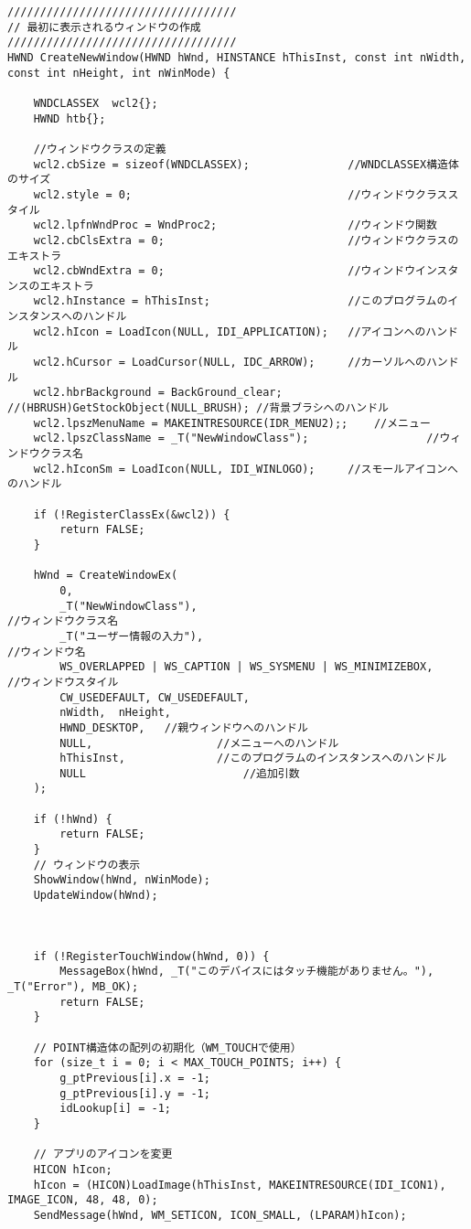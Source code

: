 \begin{lstlisting}[caption=UserInfoWindow.cpp]
///////////////////////////////////
// 最初に表示されるウィンドウの作成
///////////////////////////////////
HWND CreateNewWindow(HWND hWnd, HINSTANCE hThisInst, const int nWidth, const int nHeight, int nWinMode) {

	WNDCLASSEX	wcl2{};
	HWND htb{};

	//ウィンドウクラスの定義
	wcl2.cbSize = sizeof(WNDCLASSEX);				//WNDCLASSEX構造体のサイズ
	wcl2.style = 0;									//ウィンドウクラススタイル
	wcl2.lpfnWndProc = WndProc2;					//ウィンドウ関数
	wcl2.cbClsExtra = 0;							//ウィンドウクラスのエキストラ
	wcl2.cbWndExtra = 0;							//ウィンドウインスタンスのエキストラ
	wcl2.hInstance = hThisInst;						//このプログラムのインスタンスへのハンドル
	wcl2.hIcon = LoadIcon(NULL, IDI_APPLICATION);	//アイコンへのハンドル
	wcl2.hCursor = LoadCursor(NULL, IDC_ARROW);		//カーソルへのハンドル
	wcl2.hbrBackground = BackGround_clear;           //(HBRUSH)GetStockObject(NULL_BRUSH); //背景ブラシへのハンドル
	wcl2.lpszMenuName = MAKEINTRESOURCE(IDR_MENU2);;	//メニュー
	wcl2.lpszClassName = _T("NewWindowClass");					//ウィンドウクラス名
	wcl2.hIconSm = LoadIcon(NULL, IDI_WINLOGO);		//スモールアイコンへのハンドル

	if (!RegisterClassEx(&wcl2)) {
		return FALSE;
	}

	hWnd = CreateWindowEx(
		0,                                                                                            
		_T("NewWindowClass"),                                                                          //ウィンドウクラス名
		_T("ユーザー情報の入力"),				                                                         //ウィンドウ名
		WS_OVERLAPPED | WS_CAPTION | WS_SYSMENU | WS_MINIMIZEBOX,	 //ウィンドウスタイル
		CW_USEDEFAULT, CW_USEDEFAULT,			 
		nWidth,	 nHeight,			    
		HWND_DESKTOP,	//親ウィンドウへのハンドル
		NULL,					//メニューへのハンドル
		hThisInst,				//このプログラムのインスタンスへのハンドル
		NULL					    //追加引数
	);

	if (!hWnd) {
		return FALSE;
	}
	// ウィンドウの表示
	ShowWindow(hWnd, nWinMode);
	UpdateWindow(hWnd);



	if (!RegisterTouchWindow(hWnd, 0)) {
		MessageBox(hWnd, _T("このデバイスにはタッチ機能がありません。"), _T("Error"), MB_OK);
		return FALSE;
	}

	// POINT構造体の配列の初期化（WM_TOUCHで使用）
	for (size_t i = 0; i < MAX_TOUCH_POINTS; i++) {
		g_ptPrevious[i].x = -1;
		g_ptPrevious[i].y = -1;
		idLookup[i] = -1;
	}

	// アプリのアイコンを変更
	HICON hIcon;
	hIcon = (HICON)LoadImage(hThisInst, MAKEINTRESOURCE(IDI_ICON1), IMAGE_ICON, 48, 48, 0);
	SendMessage(hWnd, WM_SETICON, ICON_SMALL, (LPARAM)hIcon);


\end{lstlisting}
